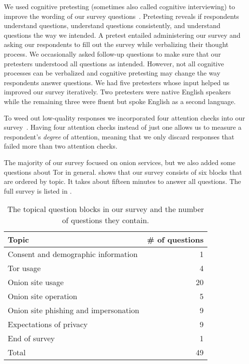 We used cognitive pretesting (sometimes also called cognitive interviewing) to
improve the wording of our survey questions~\cite{Collins2003a}.  Pretesting
reveals if respondents \first understand questions, \second understand questions
consistently, and \third understand questions the way we intended.  A pretest
entailed administering our survey and asking our respondents to fill out the
survey while verbalizing their thought process.  We occasionally asked follow-up
questions to make sure that our pretesters understood all questions as intended.
However, not all cognitive processes can be verbalized and cognitive pretesting
may change the way respondents answer questions.  We had five pretesters whose
input helped us improved our survey iteratively.  Two pretesters were native
English speakers while the remaining three were fluent but spoke English as a
second language.

To weed out low-quality responses we incorporated four attention checks into our
survey~\cite{Berinsky2014a}.  Having four attention checks instead of just one
allows us to measure a respondent's \emph{degree} of attention, meaning that we
only discard responses that failed more than two attention checks.

The majority of our survey focused on onion services, but we also added some
questions about Tor in general.   shows that our
survey consists of six blocks that are ordered by topic.  It takes about fifteen
minutes to answer all questions.  The full survey is listed in
.

\begin{table}[t]
	\centering
	\caption{The topical question blocks in our survey and the number of
	questions they contain.}
	\label{tab:survey-structure}
	\begin{tabular}{l r}
	\toprule
	Topic & \# of questions \\
	\midrule
	Consent and demographic information & 1 \\
	Tor usage & 4 \\
	Onion site usage & 20 \\
	Onion site operation & 5 \\
	Onion site phishing and impersonation & 9 \\
	Expectations of privacy & 9 \\
	End of survey & 1 \\
	\midrule
	Total & 49 \\
	\bottomrule
	\end{tabular}
\end{table}

